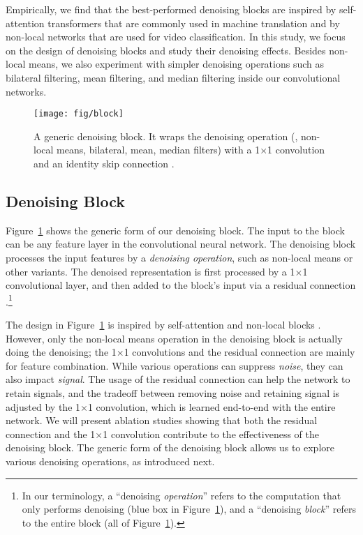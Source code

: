 \documentclass[10pt,twocolumn,letterpaper]{article}
\begin{document}
Empirically, we find that the best-performed denoising blocks are inspired by self-attention transformers \cite{Vaswani2017} that are commonly used in machine translation and by non-local networks \cite{Wang2018} that are used for video classification. In this study, we focus on the design of denoising blocks and study their denoising effects. Besides non-local means, we also experiment with simpler denoising operations such as bilateral filtering, mean filtering, and median filtering inside our convolutional networks.

\begin{figure}[t]
\centering
\texttt{[image: fig/block]}
\caption{A generic denoising block. It wraps the denoising operation (\eg, non-local means, bilateral, mean, median filters) with a 1$\times$1 convolution and an identity skip connection \cite{He2016}.}
\label{fig:block}
\end{figure}


\subsection{Denoising Block}

Figure~\ref{fig:block} shows the generic form of our denoising block. The input to the block can be any feature layer in the convolutional neural network. The denoising block processes the input features by a \emph{denoising operation}, such as non-local means or other variants. The denoised representation is first processed by a 1$\times$1 convolutional layer, and then added to the block's input via a residual connection \cite{He2016}.\footnote{In our terminology, a ``denoising \emph{operation}'' refers to the computation that only performs denoising (blue box in Figure~\ref{fig:block}), and a ``denoising \emph{block}'' refers to the entire block (all of Figure~\ref{fig:block}).}

The design in Figure~\ref{fig:block} is inspired by self-attention \cite{Vaswani2017} and non-local blocks \cite{Wang2018}. However, only the non-local means \cite{Buades2005} operation in the denoising block is actually doing the denoising; the 1$\times$1 convolutions and the residual connection are mainly for feature combination. While various operations can suppress \emph{noise}, they can also impact \emph{signal}. The usage of the residual connection can help the network to retain signals, and the tradeoff between removing noise and retaining signal is adjusted by the 1$\times$1 convolution, which is learned end-to-end with the entire network. We will present ablation studies showing that both the residual connection and the 1$\times$1 convolution contribute to the effectiveness of the denoising block. The generic form of the denoising block allows us to explore various denoising operations, as introduced next.
\end{document}
